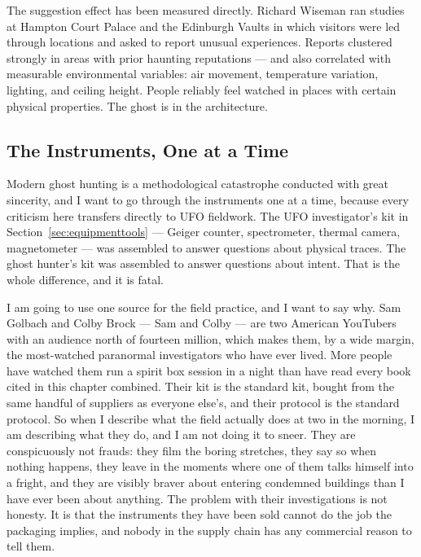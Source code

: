 \begin{funfact}
The suggestion effect has been measured directly. Richard Wiseman ran studies at Hampton Court
Palace and the Edinburgh Vaults in which visitors were led through locations and asked to
report unusual experiences. Reports clustered strongly in areas with prior haunting
reputations --- and also correlated with measurable environmental variables: air movement,
temperature variation, lighting, and ceiling height. People reliably feel watched in places
with certain physical properties. The ghost is in the architecture.
\end{funfact}

\subsection{The Instruments, One at a Time}\label{sec:ghostinstruments}
Modern ghost hunting is a methodological catastrophe conducted with great sincerity, and I want
to go through the instruments one at a time, because every criticism here transfers directly to
UFO fieldwork. The UFO investigator's kit in Section~\ref{sec:equipmenttools} --- Geiger counter,
spectrometer, thermal camera, magnetometer --- was assembled to answer questions about physical
traces. The ghost hunter's kit was assembled to answer questions about intent. That is the whole
difference, and it is fatal.

I am going to use one source for the field practice, and I want to say why. Sam Golbach and Colby
Brock --- Sam and Colby --- are two American YouTubers with an audience north of fourteen million,
which makes them, by a wide margin, the most-watched paranormal investigators who have ever
lived. More people have watched them run a spirit box session in a night than have read every
book cited in this chapter combined. Their kit is the standard kit, bought from the same handful
of suppliers as everyone else's, and their protocol is the standard protocol. So when I describe
what the field actually does at two in the morning, I am describing what they do, and I am not
doing it to sneer. They are conspicuously not frauds: they film the boring stretches, they say
so when nothing happens, they leave in the moments where one of them talks himself into a
fright, and they are visibly braver about entering condemned buildings than I have ever been
about anything. The problem with their investigations is not honesty. It is that the instruments
they have been sold cannot do the job the packaging implies, and nobody in the supply chain has
any commercial reason to tell them.

